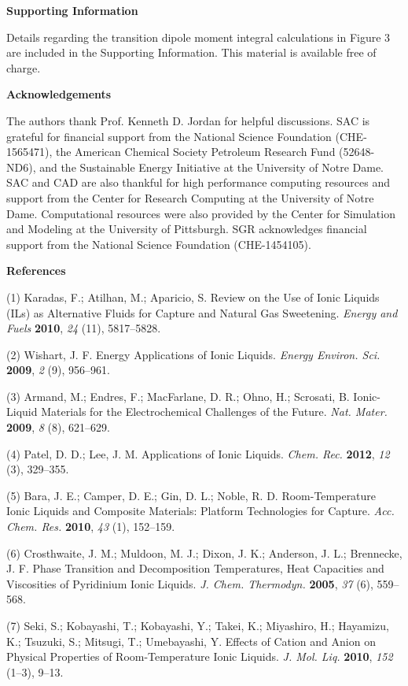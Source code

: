 \documentclass[]{article}
\begin{document}
\textbf{Supporting Information}

Details regarding the transition dipole moment integral calculations in Figure 3 are included in the Supporting Information. This material is available free of charge.

\textbf{Acknowledgements}

The authors thank Prof. Kenneth D. Jordan for helpful discussions. SAC is grateful for financial support from the National Science Foundation (CHE-1565471), the American Chemical Society Petroleum Research Fund (52648-ND6), and the Sustainable Energy Initiative at the University of Notre Dame. SAC and CAD are also thankful for high performance computing resources and support from the Center for Research Computing at the University of Notre Dame. Computational resources were also provided by the Center for Simulation and Modeling at the University of Pittsburgh.  SGR acknowledges financial support from the National Science Foundation (CHE-1454105).

\textbf{References}

(1) Karadas, F.; Atilhan, M.; Aparicio, S. Review on the Use of Ionic
Liquids (ILs) as Alternative Fluids for  Capture and
Natural Gas Sweetening. \emph{Energy and Fuels} \textbf{2010}, \emph{24}
(11), 5817--5828.

(2) Wishart, J. F. Energy Applications of Ionic Liquids. \emph{Energy
Environ. Sci.} \textbf{2009}, \emph{2} (9), 956--961.

(3) Armand, M.; Endres, F.; MacFarlane, D. R.; Ohno, H.; Scrosati, B.
Ionic-Liquid Materials for the Electrochemical Challenges of the Future.
\emph{Nat. Mater.} \textbf{2009}, \emph{8} (8), 621--629.

(4) Patel, D. D.; Lee, J. M. Applications of Ionic Liquids. \emph{Chem.
Rec.} \textbf{2012}, \emph{12} (3), 329--355.

(5) Bara, J. E.; Camper, D. E.; Gin, D. L.; Noble, R. D.
Room-Temperature Ionic Liquids and Composite Materials: Platform
Technologies for  Capture. \emph{Acc. Chem. Res.}
\textbf{2010}, \emph{43} (1), 152--159.

(6) Crosthwaite, J. M.; Muldoon, M. J.; Dixon, J. K.; Anderson, J. L.;
Brennecke, J. F. Phase Transition and Decomposition Temperatures, Heat
Capacities and Viscosities of Pyridinium Ionic Liquids. \emph{J. Chem.
Thermodyn.} \textbf{2005}, \emph{37} (6), 559--568.

(7) Seki, S.; Kobayashi, T.; Kobayashi, Y.; Takei, K.; Miyashiro, H.;
Hayamizu, K.; Tsuzuki, S.; Mitsugi, T.; Umebayashi, Y. Effects of Cation
and Anion on Physical Properties of Room-Temperature Ionic Liquids.
\emph{J. Mol. Liq.} \textbf{2010}, \emph{152} (1--3), 9--13.
\end{document}
